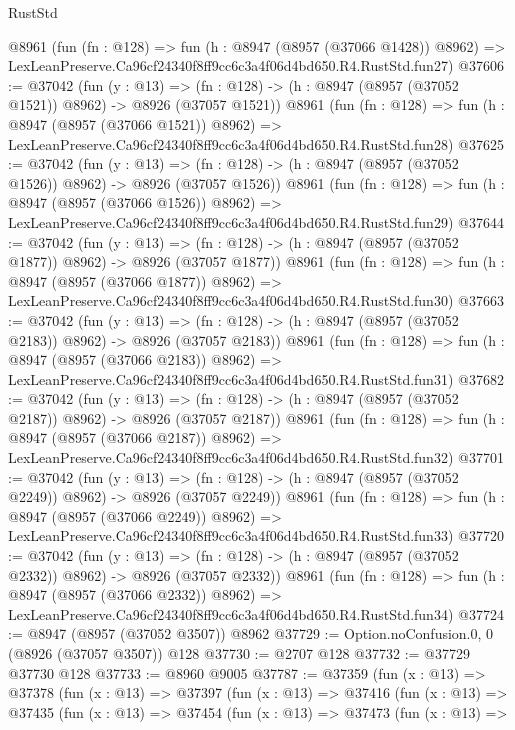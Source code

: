 \begin{lexlean}{RustStd}
\begin{coremodule}
    @8961
    (fun (fn : @128) =>
    fun (h : @8947 (@8957 (@37066 @1428)) @8962) =>
    LexLeanPreserve.Ca96cf24340f8ff9cc6c3a4f06d4bd650.R4.RustStd.fun27)
@37606 := @37042
    (fun (y : @13) =>
    (fn : @128) -> (h : @8947 (@8957 (@37052 @1521)) @8962) -> @8926 (@37057 @1521))
    @8961
    (fun (fn : @128) =>
    fun (h : @8947 (@8957 (@37066 @1521)) @8962) =>
    LexLeanPreserve.Ca96cf24340f8ff9cc6c3a4f06d4bd650.R4.RustStd.fun28)
@37625 := @37042
    (fun (y : @13) =>
    (fn : @128) -> (h : @8947 (@8957 (@37052 @1526)) @8962) -> @8926 (@37057 @1526))
    @8961
    (fun (fn : @128) =>
    fun (h : @8947 (@8957 (@37066 @1526)) @8962) =>
    LexLeanPreserve.Ca96cf24340f8ff9cc6c3a4f06d4bd650.R4.RustStd.fun29)
@37644 := @37042
    (fun (y : @13) =>
    (fn : @128) -> (h : @8947 (@8957 (@37052 @1877)) @8962) -> @8926 (@37057 @1877))
    @8961
    (fun (fn : @128) =>
    fun (h : @8947 (@8957 (@37066 @1877)) @8962) =>
    LexLeanPreserve.Ca96cf24340f8ff9cc6c3a4f06d4bd650.R4.RustStd.fun30)
@37663 := @37042
    (fun (y : @13) =>
    (fn : @128) -> (h : @8947 (@8957 (@37052 @2183)) @8962) -> @8926 (@37057 @2183))
    @8961
    (fun (fn : @128) =>
    fun (h : @8947 (@8957 (@37066 @2183)) @8962) =>
    LexLeanPreserve.Ca96cf24340f8ff9cc6c3a4f06d4bd650.R4.RustStd.fun31)
@37682 := @37042
    (fun (y : @13) =>
    (fn : @128) -> (h : @8947 (@8957 (@37052 @2187)) @8962) -> @8926 (@37057 @2187))
    @8961
    (fun (fn : @128) =>
    fun (h : @8947 (@8957 (@37066 @2187)) @8962) =>
    LexLeanPreserve.Ca96cf24340f8ff9cc6c3a4f06d4bd650.R4.RustStd.fun32)
@37701 := @37042
    (fun (y : @13) =>
    (fn : @128) -> (h : @8947 (@8957 (@37052 @2249)) @8962) -> @8926 (@37057 @2249))
    @8961
    (fun (fn : @128) =>
    fun (h : @8947 (@8957 (@37066 @2249)) @8962) =>
    LexLeanPreserve.Ca96cf24340f8ff9cc6c3a4f06d4bd650.R4.RustStd.fun33)
@37720 := @37042
    (fun (y : @13) =>
    (fn : @128) -> (h : @8947 (@8957 (@37052 @2332)) @8962) -> @8926 (@37057 @2332))
    @8961
    (fun (fn : @128) =>
    fun (h : @8947 (@8957 (@37066 @2332)) @8962) =>
    LexLeanPreserve.Ca96cf24340f8ff9cc6c3a4f06d4bd650.R4.RustStd.fun34)
@37724 := @8947 (@8957 (@37052 @3507)) @8962
@37729 := Option.noConfusion.{0, 0} (@8926 (@37057 @3507)) @128
@37730 := @2707 @128
@37732 := @37729 @37730 @128
@37733 := @8960 @9005
@37787 := @37359
    (fun (x : @13) =>
    @37378
      (fun (x : @13) =>
      @37397
        (fun (x : @13) =>
        @37416
          (fun (x : @13) =>
          @37435
            (fun (x : @13) =>
            @37454
              (fun (x : @13) =>
              @37473
                (fun (x : @13) =>

\end{coremodule}
\end{lexlean}

